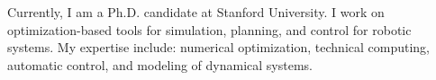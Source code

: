 

\begin{cvparagraph}

Currently, I am a Ph.D. candidate at Stanford University. I work on optimization-based tools for simulation, planning, and control for robotic systems. My expertise include: numerical optimization, technical computing, automatic control, and modeling of dynamical systems.
\end{cvparagraph}
